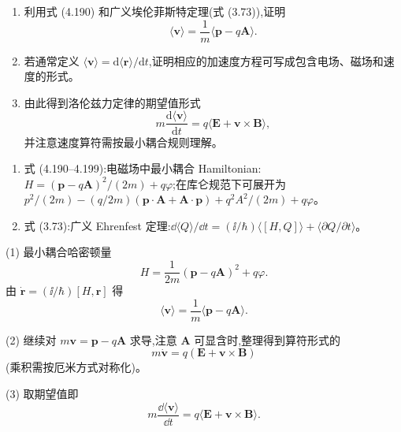 \begin{question}
\begin{enumerate}
\item 利用式 (4.190) 和广义埃伦菲斯特定理(式 (3.73)),证明
\[
\langle\mathbf v\rangle=\frac1m\langle \mathbf p-q\mathbf A\rangle.
\]
\item 若通常定义 $\langle\mathbf v\rangle=\mathrm d\langle\mathbf r\rangle/\mathrm dt$,证明相应的加速度方程可写成包含电场、磁场和速度的形式。
\item 由此得到洛伦兹力定律的期望值形式
\[
m\frac{\mathrm d\langle\mathbf v\rangle}{\mathrm dt}=q\langle\mathbf E+\mathbf v\times\mathbf B\rangle,
\]
并注意速度算符需按最小耦合规则理解。
\end{enumerate}

\par\smallskip
{}
\begin{enumerate}[leftmargin=2.2em,itemsep=0.12em,topsep=0.12em,parsep=0pt]
\item 式 (4.190--4.199):电磁场中最小耦合 Hamiltonian:$H=(\mathbf p-q\mathbf A)^2/(2m)+q\varphi$;在库仑规范下可展开为 $p^2/(2m)-(q/2m)(\mathbf p\cdot\mathbf A+\mathbf A\cdot\mathbf p)+q^2A^2/(2m)+q\varphi$。
\item 式 (3.73):广义 Ehrenfest 定理:$\dd\langle Q\rangle/\dd t=(\ii/\hbar)\langle[H,Q]\rangle+\langle\partial Q/\partial t\rangle$。
\end{enumerate}

\begin{solution}

(1) 最小耦合哈密顿量
\[
H=\frac{1}{2m}(\mathbf p-q\mathbf A)^2+q\varphi.
\]
由 $\dot{\mathbf r}=(\ii/\hbar)[H,\mathbf r]$ 得
\[
\langle\mathbf v\rangle=\frac{1}{m}\langle\mathbf p-q\mathbf A\rangle.
\]

(2) 继续对 $m\mathbf v=\mathbf p-q\mathbf A$ 求导,注意 $\mathbf A$ 可显含时,整理得到算符形式的
\[
m\dot{\mathbf v}=q(\mathbf E+\mathbf v\times\mathbf B)
\]
(乘积需按厄米方式对称化)。

(3) 取期望值即
\[
m\frac{\dd\langle\mathbf v\rangle}{\dd t}=q\langle\mathbf E+\mathbf v\times\mathbf B\rangle.
\]

\end{solution}
\end{question}

